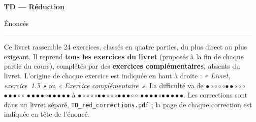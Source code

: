 \documentclass[a4paper,11pt]{article}
\numberwithin{equation}{section}
\numberwithin{figure}{section}
\numberwithin{table}{section}
\theoremstyle{enonce}
\theoremstyle{exemple}
\theoremstyle{remarque}
\newcommand{\niveau}[1]{{\color{Ocre}\footnotesize
  \ifcase#1\or$\bullet\circ\circ\circ\circ$\or$\bullet\bullet\circ\circ\circ$\or$\bullet\bullet\bullet\circ\circ$%
  \or$\bullet\bullet\bullet\bullet\circ$\or$\bullet\bullet\bullet\bullet\bullet$\fi}}
\begin{document}
\thispagestyle{plain}
{\sffamily\small\color{Gris}}\par\vspace{0.2em}
{\sffamily\bfseries\fontsize{26}{30}\selectfont\color{Ink}TD --- Réduction}\par\vspace{0.3em}
{\sffamily\Large\color{BleuMoyen}Énoncés}\par\vspace{0.4em}
{\color{Ocre}\rule{3.2cm}{1.4pt}}\par\vspace{0.8em}
{\small Ce livret rassemble 24 exercices, classés en quatre parties, du plus direct au plus exigeant.
Il reprend \textbf{tous les exercices du livret} (proposés à la fin de chaque partie du cours), complétés par des
\textbf{exercices complémentaires}, absents du livret. L'origine de chaque exercice est indiquée en haut à droite :
\emph{« Livret, exercice~1.5 »} ou \emph{« Exercice complémentaire »}. La difficulté va de \niveau{1} à \niveau{5}.
Les corrections sont dans un livret séparé, \texttt{TD\_red\_corrections.pdf} ; la page de chaque correction est indiquée en tête de l'énoncé.}
\end{document}
